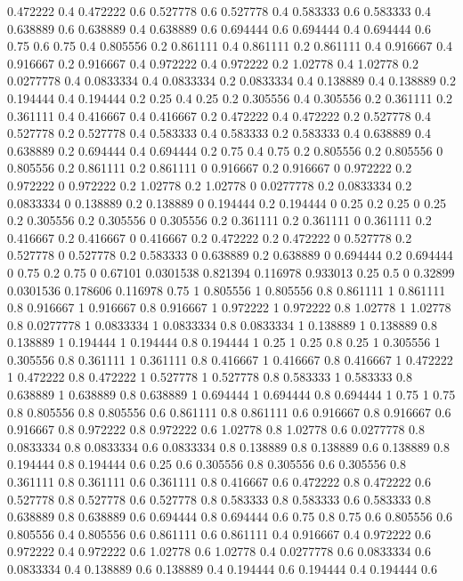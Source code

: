 0.472222 0.4
0.472222 0.6
0.527778 0.6
0.527778 0.4
0.583333 0.6
0.583333 0.4
0.638889 0.6
0.638889 0.4
0.638889 0.6
0.694444 0.6
0.694444 0.4
0.694444 0.6
0.75 0.6
0.75 0.4
0.805556 0.2
0.861111 0.4
0.861111 0.2
0.861111 0.4
0.916667 0.4
0.916667 0.2
0.916667 0.4
0.972222 0.4
0.972222 0.2
1.02778 0.4
1.02778 0.2
0.0277778 0.4
0.0833334 0.4
0.0833334 0.2
0.0833334 0.4
0.138889 0.4
0.138889 0.2
0.194444 0.4
0.194444 0.2
0.25 0.4
0.25 0.2
0.305556 0.4
0.305556 0.2
0.361111 0.2
0.361111 0.4
0.416667 0.4
0.416667 0.2
0.472222 0.4
0.472222 0.2
0.527778 0.4
0.527778 0.2
0.527778 0.4
0.583333 0.4
0.583333 0.2
0.583333 0.4
0.638889 0.4
0.638889 0.2
0.694444 0.4
0.694444 0.2
0.75 0.4
0.75 0.2
0.805556 0.2
0.805556 0
0.805556 0.2
0.861111 0.2
0.861111 0
0.916667 0.2
0.916667 0
0.972222 0.2
0.972222 0
0.972222 0.2
1.02778 0.2
1.02778 0
0.0277778 0.2
0.0833334 0.2
0.0833334 0
0.138889 0.2
0.138889 0
0.194444 0.2
0.194444 0
0.25 0.2
0.25 0
0.25 0.2
0.305556 0.2
0.305556 0
0.305556 0.2
0.361111 0.2
0.361111 0
0.361111 0.2
0.416667 0.2
0.416667 0
0.416667 0.2
0.472222 0.2
0.472222 0
0.527778 0.2
0.527778 0
0.527778 0.2
0.583333 0
0.638889 0.2
0.638889 0
0.694444 0.2
0.694444 0
0.75 0.2
0.75 0
0.67101 0.0301538
0.821394 0.116978
0.933013 0.25
0.5 0
0.32899 0.0301536
0.178606 0.116978
0.75 1
0.805556 1
0.805556 0.8
0.861111 1
0.861111 0.8
0.916667 1
0.916667 0.8
0.916667 1
0.972222 1
0.972222 0.8
1.02778 1
1.02778 0.8
0.0277778 1
0.0833334 1
0.0833334 0.8
0.0833334 1
0.138889 1
0.138889 0.8
0.138889 1
0.194444 1
0.194444 0.8
0.194444 1
0.25 1
0.25 0.8
0.25 1
0.305556 1
0.305556 0.8
0.361111 1
0.361111 0.8
0.416667 1
0.416667 0.8
0.416667 1
0.472222 1
0.472222 0.8
0.472222 1
0.527778 1
0.527778 0.8
0.583333 1
0.583333 0.8
0.638889 1
0.638889 0.8
0.638889 1
0.694444 1
0.694444 0.8
0.694444 1
0.75 1
0.75 0.8
0.805556 0.8
0.805556 0.6
0.861111 0.8
0.861111 0.6
0.916667 0.8
0.916667 0.6
0.916667 0.8
0.972222 0.8
0.972222 0.6
1.02778 0.8
1.02778 0.6
0.0277778 0.8
0.0833334 0.8
0.0833334 0.6
0.0833334 0.8
0.138889 0.8
0.138889 0.6
0.138889 0.8
0.194444 0.8
0.194444 0.6
0.25 0.6
0.305556 0.8
0.305556 0.6
0.305556 0.8
0.361111 0.8
0.361111 0.6
0.361111 0.8
0.416667 0.6
0.472222 0.8
0.472222 0.6
0.527778 0.8
0.527778 0.6
0.527778 0.8
0.583333 0.8
0.583333 0.6
0.583333 0.8
0.638889 0.8
0.638889 0.6
0.694444 0.8
0.694444 0.6
0.75 0.8
0.75 0.6
0.805556 0.6
0.805556 0.4
0.805556 0.6
0.861111 0.6
0.861111 0.4
0.916667 0.4
0.972222 0.6
0.972222 0.4
0.972222 0.6
1.02778 0.6
1.02778 0.4
0.0277778 0.6
0.0833334 0.6
0.0833334 0.4
0.138889 0.6
0.138889 0.4
0.194444 0.6
0.194444 0.4
0.194444 0.6
